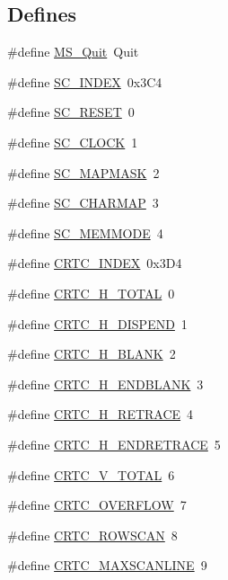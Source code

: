 \subsection*{Defines}
\begin{DoxyCompactItemize}
\item 
\#define \hyperlink{ID__VL_8H_ad8efcae5e17b4673b60b3f2d46146405}{MS\_\-Quit}~Quit
\item 
\#define \hyperlink{ID__VL_8H_a4a8f78b8980dcd8e682601e17f87d8bf}{SC\_\-INDEX}~0x3C4
\item 
\#define \hyperlink{ID__VL_8H_a852052e8a9dfb0d2d922c341402e15c6}{SC\_\-RESET}~0
\item 
\#define \hyperlink{ID__VL_8H_a589153f79542568568e6f4dd8d128cac}{SC\_\-CLOCK}~1
\item 
\#define \hyperlink{ID__VL_8H_ac0b0131be9d3c04c300a643ddb66570c}{SC\_\-MAPMASK}~2
\item 
\#define \hyperlink{ID__VL_8H_a597678356c0e141a803258510f9a6559}{SC\_\-CHARMAP}~3
\item 
\#define \hyperlink{ID__VL_8H_a4a5fd9c10a4ff7291f29a007dcbc1aa1}{SC\_\-MEMMODE}~4
\item 
\#define \hyperlink{ID__VL_8H_a3b790e9ee5a615e51293d71489a3e077}{CRTC\_\-INDEX}~0x3D4
\item 
\#define \hyperlink{ID__VL_8H_a4248632676475df06a0f83c89832d7bc}{CRTC\_\-H\_\-TOTAL}~0
\item 
\#define \hyperlink{ID__VL_8H_a1b3d0398466e22665b1db5c21319fc36}{CRTC\_\-H\_\-DISPEND}~1
\item 
\#define \hyperlink{ID__VL_8H_aaf101acbaa798e95f47bff090684bff2}{CRTC\_\-H\_\-BLANK}~2
\item 
\#define \hyperlink{ID__VL_8H_ab46d10c13c2f64296f504e155513be64}{CRTC\_\-H\_\-ENDBLANK}~3
\item 
\#define \hyperlink{ID__VL_8H_ab81a3b0ebf68c4e621cfb7445761cedc}{CRTC\_\-H\_\-RETRACE}~4
\item 
\#define \hyperlink{ID__VL_8H_aac88890fb6f7215cedb2c7a6a3fda394}{CRTC\_\-H\_\-ENDRETRACE}~5
\item 
\#define \hyperlink{ID__VL_8H_a23f37b917baa4963c16670ff9db90487}{CRTC\_\-V\_\-TOTAL}~6
\item 
\#define \hyperlink{ID__VL_8H_a6a6e6c563378e17f78bd8fb4bcd52e43}{CRTC\_\-OVERFLOW}~7
\item 
\#define \hyperlink{ID__VL_8H_a79b18a765c38a2f3d437c922816263af}{CRTC\_\-ROWSCAN}~8
\item 
\#define \hyperlink{ID__VL_8H_a595b4bee4717cb7cc03d6857823913f2}{CRTC\_\-MAXSCANLINE}~9

\end{DoxyCompactItemize}
